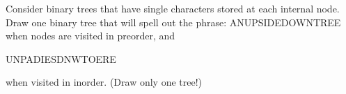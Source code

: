 Consider binary trees that have single characters stored at each
internal node.  Draw one binary tree that will spell out the phrase:
{\sf ANUPSIDEDOWNTREE} when nodes are visited in preorder, and {\sf

UNPADIESDNWTOERE} when visited in inorder. (Draw only one tree!)

